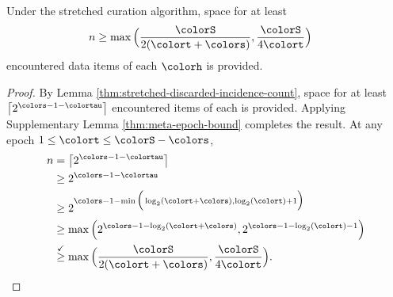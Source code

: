 \begin{corollary}
\label{thm:stretched-reservation-count}
Under the stretched curation algorithm, space for at least
\begin{align*}
n &\geq
\max\Big(
  \frac{\colorS}{2(\colort + \colors)},
  \frac{\colorS}{4\colort}
\Big)
\end{align*}
encountered data items of each \hv{} $\colorh$ is provided.
\end{corollary}
\begin{proof}

By Lemma \ref{thm:stretched-discarded-incidence-count}, space for at least $\left\lceil 2^{\colors - 1 - \colortau} \right\rceil$ encountered items of each \hv{} is provided.
Applying Supplementary Lemma \ref{thm:meta-epoch-bound} completes the result.
At any epoch $1 \leq \colort \leq \colorS - \colors$,
\begin{align*}
n
&= \left\lceil 2^{\colors - 1 - \colortau} \right\rceil\\
&\geq 2^{\colors - 1 - \colortau}\\
&\geq2^{\colors - 1 - \min\Big(
  \log_2(\colort + \colors),
  \log_2(\colort) + 1
\Big)}\\
&\geq \max\Big(
  2^{\colors - 1 - \log_2(\colort + \colors)},
  2^{\colors - 1 - \log_2(\colort) - 1}
\Big)\\
&\stackrel{\checkmark}{\geq} \max\Big(
  \frac{\colorS}{2(\colort + \colors)},
  \frac{\colorS}{4\colort}
\Big).
\end{align*}

\end{proof}
